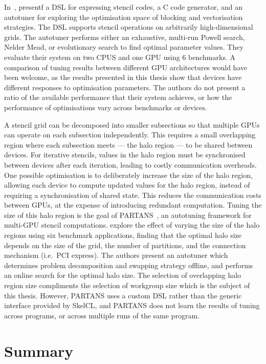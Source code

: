 In~\cite{Christen2011}, \citeauthor{Christen2011} presentf a DSL for
expressing stencil codes, a C code generator, and an autotuner for
exploring the optimisation space of blocking and vectorisation
strategies. The DSL supports stencil operations on arbitrarily
high-dimensional grids. The autotuner performs either an exhaustive,
multi-run Powell search, Nelder Mead, or evolutionary search to find
optimal parameter values. They evaluate their system on two CPUS and
one GPU using 6 benchmarks. A comparison of tuning results between
different GPU architectures would have been welcome, as the results
presented in this thesis show that devices have different responses to
optimisation parameters. The authors do not present a ratio of the
available performance that their system achieves, or how the
performance of optimisations vary across benchmarks or devices.

A stencil grid can be decomposed into smaller subsections so that
multiple GPUs can operate on each subsection independently. This
requires a small overlapping region where each subsection meets ---
the halo region --- to be shared between devices. For iterative
stencils, values in the halo region must be synchronised between
devices after each iteration, leading to costly communication
overheads. One possible optimisation is to deliberately increase the
size of the halo region, allowing each device to compute updated
values for the halo region, instead of requiring a synchronisation of
shared state. This reduces the communication costs between GPUs, at
the expense of introducing redundant computation. Tuning the size of
this halo region is the goal of PARTANS~\cite{Lutz2013}, an autotuning
framework for multi-GPU stencil computations. \citeauthor{Lutz2013}
explore the effect of varying the size of the halo regions using six
benchmark applications, finding that the optimal halo size depends on
the size of the grid, the number of partitions, and the connection
mechanism (i.e.\ PCI express). The authors present an autotuner which
determines problem decomposition and swapping strategy offline, and
performs an online search for the optimal halo size. The selection of
overlapping halo region size compliments the selection of workgroup
size which is the subject of this thesis. However, PARTANS uses a
custom DSL rather than the generic interface provided by SkelCL, and
PARTANS does not learn the results of tuning across programs, or
across multiple runs of the same program.


\section{Summary}

